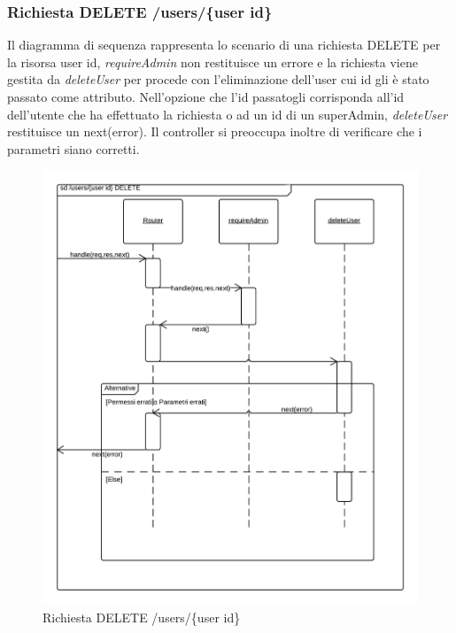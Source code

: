 \subsubsection{Richiesta DELETE /users/\{user id\}} 
Il diagramma di sequenza rappresenta lo scenario di una richiesta DELETE per la risorsa user id, \emph{requireAdmin} non restituisce un errore e la richiesta viene gestita da \emph{deleteUser} per procede con l'eliminazione dell'user cui id gli è stato passato come attributo.
Nell'opzione che l'id passatogli corrisponda all'id dell'utente che ha effettuato la richiesta o ad un id di un superAdmin, \emph{deleteUser} restituisce un next(error). Il controller si preoccupa inoltre di verificare che i parametri siano corretti.
\begin{figure}[H]
	\begin{center} 
		\includegraphics[scale=0.20]{scenari/Users Id DELETE.png} 
		\caption{Richiesta DELETE /users/\{user id\}}
	\end{center} 
\end{figure}

\pagebreak
